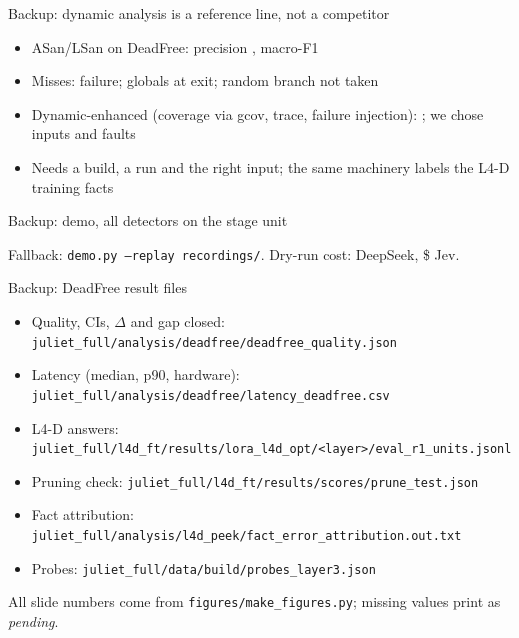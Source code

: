 \begin{frame}{Backup: dynamic analysis is a reference line, not a competitor}
  \begin{itemize}
    \item ASan/LSan on DeadFree: precision , macro-F1 
    \item Misses:  failure; globals at exit; random branch not taken
    \item Dynamic-enhanced (coverage via gcov, trace, failure injection): ; we chose inputs and faults
    \item Needs a build, a run and the right input; the same machinery labels the L4-D training facts
  \end{itemize}
\end{frame}

\begin{frame}{Backup: demo, all detectors on the stage unit}
  \centering
  {\footnotesize\par}
  \vfill
  {\scriptsize Fallback: \texttt{demo.py --replay recordings/}. Dry-run cost: \textyen{} DeepSeek, \$ Jev.\par}
\end{frame}

\begin{frame}{Backup: DeadFree result files}
  \footnotesize
  \begin{itemize}
    \item Quality, CIs, $\Delta$ and gap closed: \texttt{juliet\_full/analysis/deadfree/deadfree\_quality.json}
    \item Latency (median, p90, hardware): \texttt{juliet\_full/analysis/deadfree/latency\_deadfree.csv}
    \item L4-D answers: \texttt{juliet\_full/l4d\_ft/results/lora\_l4d\_opt/<layer>/eval\_r1\_units.jsonl}
    \item Pruning check: \texttt{juliet\_full/l4d\_ft/results/scores/prune\_test.json}
    \item Fact attribution: \texttt{juliet\_full/analysis/l4d\_peek/fact\_error\_attribution.out.txt}
    \item Probes: \texttt{juliet\_full/data/build/probes\_layer3.json}
  \end{itemize}
  \vfill
  {\scriptsize All slide numbers come from \texttt{figures/make\_figures.py}; missing values print as \textit{pending}.\par}
\end{frame}


